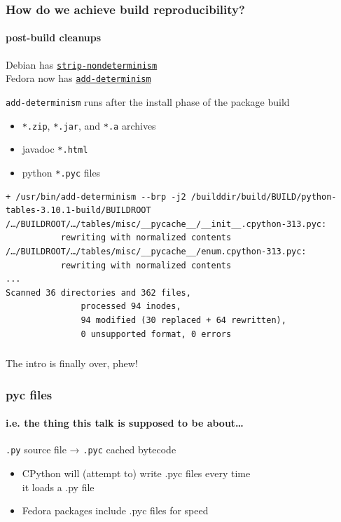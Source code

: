 \documentclass[]{beamer}
\begin{document}
\begin{frame}[fragile]
  \frametitle{How do we achieve build reproducibility?}
  \framesubtitle{post-build cleanups}

  \vfill
  \pause

  Debian has \href{https://packages.debian.org/sid/dh-strip-nondeterminism}{\texttt{strip-nondeterminism}}\\
  Fedora now has \href{https://github.com/keszybz/add-determinism}{\texttt{add-determinism}}\\

  \vfill
  \pause

  \texttt{add-determinism} runs after the install phase of the package build

  \vfill

  \begin{itemize}
    \item \texttt{*.zip}, \texttt{*.jar}, and \texttt{*.a} archives
    \item javadoc \texttt{*.html}
    \item python \texttt{*.pyc} files
  \end{itemize}

  \vfill
  \pause
  
  {\tiny
  \begin{verbatim}
+ /usr/bin/add-determinism --brp -j2 /builddir/build/BUILD/python-tables-3.10.1-build/BUILDROOT    
/…/BUILDROOT/…/tables/misc/__pycache__/__init__.cpython-313.pyc:
           rewriting with normalized contents
/…/BUILDROOT/…/tables/misc/__pycache__/enum.cpython-313.pyc:
           rewriting with normalized contents
...
Scanned 36 directories and 362 files,
               processed 94 inodes,
               94 modified (30 replaced + 64 rewritten),
               0 unsupported format, 0 errors
  \end{verbatim}
  }
\end{frame}

\begin{frame}
  \frametitle{}

  \hfill \large{The intro is finally over, phew!} \hfill{}
\end{frame}

\begin{frame}
  \frametitle{pyc files}
  \framesubtitle{i.e. the thing this talk is supposed to be about…}

  \pause
  \vfill

  \texttt{.py} source file → \texttt{.pyc} cached bytecode
  
  \pause
  \vfill

  \begin{itemize}
  \item CPython will (attempt to) write .pyc files every time\\
    it loads a .py file
  \item Fedora packages include .pyc files for speed
  \end{itemize}

  \vfill
\end{frame}
\end{document}
